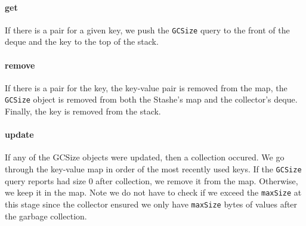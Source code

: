 \paragraph{get} 
If there is a pair for a given key, we push the \lstinline{GCSize} query to the
front of the deque and the key to the top of the stack.

\paragraph{remove} 
If there is a pair for the key, the key-value pair is removed from the map, the
\lstinline{GCSize} object is removed from both the Stashe's map and the
collector's deque. Finally, the key is removed from the stack.

\paragraph{update} 
If any of the GCSize objects were updated, then a collection occured. We go
through the key-value map in order of the most recently used keys. If the
\lstinline{GCSize} query reports had size 0 after collection, we remove it from
the map. Otherwise, we keep it in the map. Note we do not have to check if we
exceed the \lstinline{maxSize} at this stage since the collector ensured we only
have \lstinline{maxSize} bytes of values after the garbage collection.

